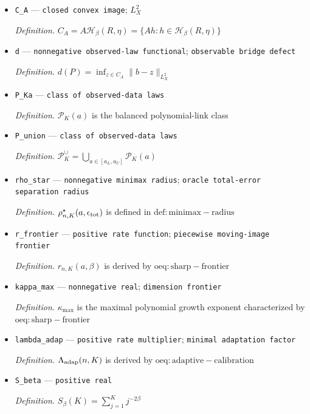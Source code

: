 \documentclass{article}
\begin{document}
\begin{itemize}
  \item \texttt{C\_\allowbreak{}A} --- \texttt{closed convex image}; \(L^2_X\)
  \par\smallskip\noindent\emph{Definition.} \(C_A=A\mathcal H_\beta(R,\eta)=\{Ah:h\in\mathcal H_\beta(R,\eta)\}\)
  \item \texttt{d} --- \texttt{nonnegative observed-\allowbreak{}law functional}; \texttt{observable bridge defect}
  \par\smallskip\noindent\emph{Definition.} \(d(P)=\inf_{z\in C_A}\|b-z\|_{L^2_X}\)
  \item \texttt{P\_\allowbreak{}Ka} --- \texttt{class of observed-\allowbreak{}data laws}
  \par\smallskip\noindent\emph{Definition.} \(\mathcal P_K(a)\) is the balanced polynomial-link class
  \item \texttt{P\_\allowbreak{}union} --- \texttt{class of observed-\allowbreak{}data laws}
  \par\smallskip\noindent\emph{Definition.} \(\mathcal P_K^{\cup}=\bigcup_{a\in[a_L,a_U]}\mathcal P_K(a)\)
  \item \texttt{rho\_\allowbreak{}star} --- \texttt{nonnegative minimax radius}; \texttt{oracle total-\allowbreak{}error separation radius}
  \par\smallskip\noindent\emph{Definition.} \(\rho^\star_{n,K}(a,\epsilon_{\rm tot})\) is defined in \(\mathrm{def:minimax-radius}\)
  \item \texttt{r\_\allowbreak{}frontier} --- \texttt{positive rate function}; \texttt{piecewise moving-\allowbreak{}image frontier}
  \par\smallskip\noindent\emph{Definition.} \(r_{n,K}(a,\beta)\) is derived by \(\mathrm{oeq:sharp-frontier}\)
  \item \texttt{kappa\_\allowbreak{}max} --- \texttt{nonnegative real}; \texttt{dimension frontier}
  \par\smallskip\noindent\emph{Definition.} \(\kappa_{\max}\) is the maximal polynomial growth exponent characterized by \(\mathrm{oeq:sharp-frontier}\)
  \item \texttt{lambda\_\allowbreak{}adap} --- \texttt{positive rate multiplier}; \texttt{minimal adaptation factor}
  \par\smallskip\noindent\emph{Definition.} \(\Lambda_{\rm adap}(n,K)\) is derived by \(\mathrm{oeq:adaptive-calibration}\)
  \item \texttt{S\_\allowbreak{}beta} --- \texttt{positive real}
  \par\smallskip\noindent\emph{Definition.} \(S_\beta(K)=\sum_{j=1}^K j^{-2\beta}\)

\end{itemize}
\end{document}
